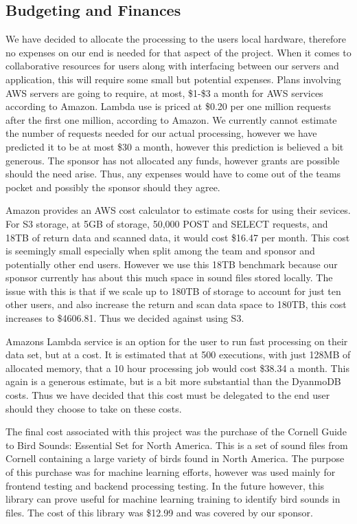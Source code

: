 \subsection{Budgeting and Finances}
We have decided to allocate the processing to the user\textquotesingle s local hardware, therefore no expenses on our end is needed for that aspect of the project. When it comes to collaborative resources for users along with interfacing between our servers and application, this will require some small but potential expenses. Plans involving AWS servers are going to require, at most, \$1-\$3 a month for AWS services according to Amazon. Lambda use is priced at \$0.20 per one million requests after the first one million, according to Amazon. We currently cannot estimate the number of requests needed for our actual processing, however we have predicted it to be at most \$30 a month, however this prediction is believed a bit generous. The sponsor has not allocated any funds, however grants are possible should the need arise. Thus, any expenses would have to come out of the team\textquotesingle s pocket and possibly the sponsor should they agree.\par
Amazon provides an AWS cost calculator to estimate costs for using their sevices. For S3 storage, at 5GB of storage, 50,000 POST and SELECT requests, and 18TB of return data and scanned data, it would cost \$16.47 per month. This cost is seemingly small especially when split among the team and sponsor and potentially other end users. However we use this 18TB benchmark because our sponsor currently has about this much space in sound files stored locally. The issue with this is that if we scale up to 180TB of storage to account for just ten other users, and also increase the return and scan data space to 180TB, this cost increases to \$4606.81. Thus we decided against using S3.\par
Amazon\textquotesingle s Lambda service is an option for the user to run fast processing on their data set, but at a cost. It is estimated that at 500 executions, with just 128MB of allocated memory, that a 10 hour processing job would cost \$38.34 a month. This again is a generous estimate, but is a bit more substantial than the DyanmoDB costs. Thus we have decided that this cost must be delegated to the end user should they choose to take on these costs.\par
The final cost associated with this project was the purchase of the Cornell Guide to Bird Sounds: Essential Set for North America. This is a set of sound files from Cornell containing a large variety of birds found in North America. The purpose of this purchase was for machine learning efforts, however was used mainly for frontend testing and backend processing testing. In the future however, this library can prove useful for machine learning training to identify bird sounds in files. The cost of this library was \$12.99 and was covered by our sponsor.
